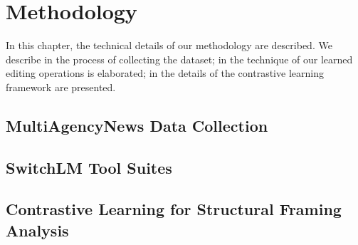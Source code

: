 \chapter{Methodology}
In this chapter, the technical details of our methodology are described. We describe in  the process of collecting the dataset; in  the technique of our learned editing operations is elaborated; in  the details of the contrastive learning framework are presented.

\section{MultiAgencyNews Data Collection}
\label{data-collection}


\section{SwitchLM Tool Suites}
\label{switchlm}

\section{Contrastive Learning for Structural Framing Analysis}
\label{genco}